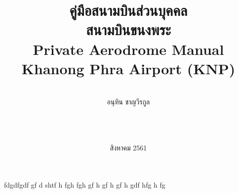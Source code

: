 \documentclass[12pt, twoside]{book}
\title{คู่มือสนามบินส่วนบุคคล \\
	สนามบินขนงพระ \\
	Private Aerodrome Manual \\
	Khanong Phra Airport (KNP) \\
}
\author{ \pgfornament[color=red!40!black, width=5cm]{88} \\
			\LARGE{อนุทิน ชาญวีรกูล}  \\
			\pgfornament[color=red!40!black, width=5cm]{88} \\ \\ \\
}
\date{\Large{สิงหาคม 2561}}    %
\begin{document}
\maketitle				%
\newpage\mbox{}\thispagestyle{empty}\newpage
{} 	%


\tableofcontents		%
\listoftables			%
\listoffigures			%
\newpage\mbox{}\thispagestyle{empty}\newpage
\clearpage				%


fdgdfgdf gf d shtf h fgh fgh gf h gf h gf h gdf hfg h fg
\end{document}
